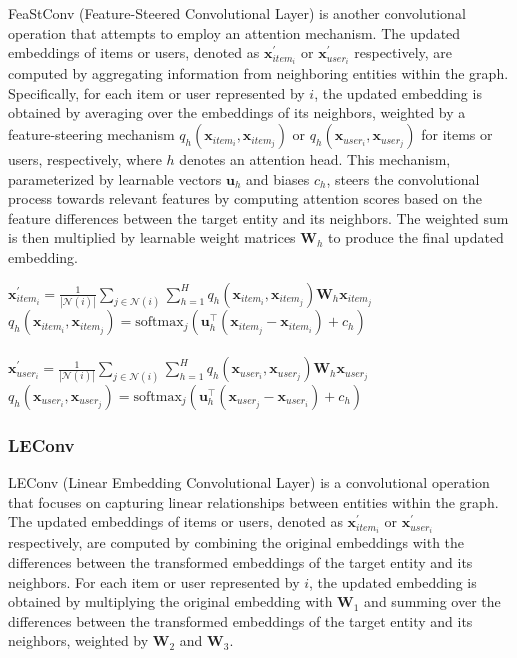 \documentclass{scrartcl}
\begin{document}
\quad FeaStConv (Feature-Steered Convolutional Layer) is another  convolutional operation that attempts to employ an attention mechanism. The updated embeddings of items or users, denoted as $\mathbf{x}^{\prime}_{item_i}$ or $\mathbf{x}^{\prime}_{user_i}$ respectively, are computed by aggregating information from neighboring entities within the graph. Specifically, for each item or user represented by $i$, the updated embedding is obtained by averaging over the embeddings of its neighbors, weighted by a feature-steering mechanism $q_h(\mathbf{x}_{item_i}, \mathbf{x}_{item_j})$ or $q_h(\mathbf{x}_{user_i}, \mathbf{x}_{user_j})$ for items or users, respectively, where $h$ denotes an attention head. This mechanism, parameterized by learnable vectors $\mathbf{u}_h$ and biases $c_h$, steers the convolutional process towards relevant features by computing attention scores based on the feature differences between the target entity and its neighbors. The weighted sum is then multiplied by learnable weight matrices $\mathbf{W}_h$ to produce the final updated embedding. \\ 

\begin{center}
    $\mathbf{x}^{\prime}_{item_{i}} = \frac{1}{|\mathcal{N}(i)|} \sum_{j \in \mathcal{N}(i)} \sum_{h=1}^H
    q_h(\mathbf{x}_{item_{i}}, \mathbf{x}_{item_{j}}) \mathbf{W}_h \mathbf{x}_{item_{j}}$ \\
    $q_h(\mathbf{x}_{item_{i}}, \mathbf{x}_{item_{j}}) = \mathrm{softmax}_{j}
    (\mathbf{u}_h^{\top} (\mathbf{x}_{item_{j}} - \mathbf{x}_{item_{i}}) + c_h)$
    \\~\\
    $\mathbf{x}^{\prime}_{user_{i}} = \frac{1}{|\mathcal{N}(i)|} \sum_{j \in \mathcal{N}(i)} \sum_{h=1}^H
    q_h(\mathbf{x}_{user_{i}}, \mathbf{x}_{user_{j}}) \mathbf{W}_h \mathbf{x}_{user_{j}}$ \\ 
     $q_h(\mathbf{x}_{user_{i}}, \mathbf{x}_{user_{j}}) = \mathrm{softmax}_j
    (\mathbf{u}_h^{\top} (\mathbf{x}_{user_{j}} - \mathbf{x}_{user_{i}}) + c_h)$
\end{center}


\subsubsection{LEConv\cite{leconv}} 

\quad LEConv (Linear Embedding Convolutional Layer) is a convolutional operation that focuses on capturing linear relationships between entities within the graph. The updated embeddings of items or users, denoted as $\mathbf{x}^{\prime}_{item_i}$ or $\mathbf{x}^{\prime}_{user_i}$ respectively, are computed by combining the original embeddings with the differences between the transformed embeddings of the target entity and its neighbors. For each item or user represented by $i$, the updated embedding is obtained by multiplying the original embedding with $\mathbf{W}_1$ and summing over the differences between the transformed embeddings of the target entity and its neighbors, weighted by $\mathbf{W}_2$ and $\mathbf{W}_3$. \\ 
\end{document}
